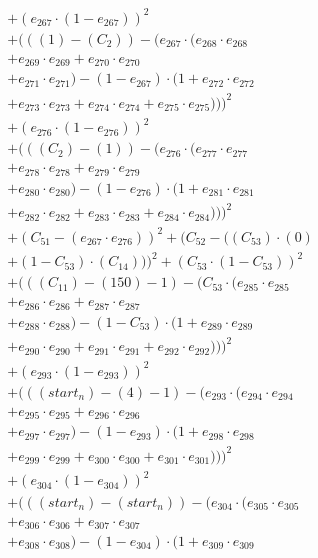 \documentclass[10pt, a4paper]{article}
\begin{document}
\begin{small}
\begin{align*}
& + (e_{267} \cdot (1 - e_{267}))^{2} \\
& + (((1) - (C_{2})) - (e_{267} \cdot (e_{268} \cdot e_{268} \\
& + e_{269} \cdot e_{269} + e_{270} \cdot e_{270} \\
& + e_{271} \cdot e_{271}) - (1 - e_{267}) \cdot (1 + e_{272} \cdot e_{272} \\
& + e_{273} \cdot e_{273} + e_{274} \cdot e_{274} + e_{275} \cdot e_{275})))^{2} \\
& + (e_{276} \cdot (1 - e_{276}))^{2} \\
& + (((C_{2}) - (1)) - (e_{276} \cdot (e_{277} \cdot e_{277} \\
& + e_{278} \cdot e_{278} + e_{279} \cdot e_{279} \\
& + e_{280} \cdot e_{280}) - (1 - e_{276}) \cdot (1 + e_{281} \cdot e_{281} \\
& + e_{282} \cdot e_{282} + e_{283} \cdot e_{283} + e_{284} \cdot e_{284})))^{2} \\
& + (C_{51} - (e_{267} \cdot e_{276}))^{2} + (C_{52} - ((C_{53})  \cdot  (0) \\
& + (1 - C_{53})  \cdot  (C_{14})))^{2} + (C_{53} \cdot (1 - C_{53}))^{2} \\
& + (((C_{11}) - (150) - 1) - (C_{53} \cdot (e_{285} \cdot e_{285} \\
& + e_{286} \cdot e_{286} + e_{287} \cdot e_{287} \\
& + e_{288} \cdot e_{288}) - (1 - C_{53}) \cdot (1 + e_{289} \cdot e_{289} \\
& + e_{290} \cdot e_{290} + e_{291} \cdot e_{291} + e_{292} \cdot e_{292})))^{2} \\
& + (e_{293} \cdot (1 - e_{293}))^{2} \\
& + (((start_n) - (4) - 1) - (e_{293} \cdot (e_{294} \cdot e_{294} \\
& + e_{295} \cdot e_{295} + e_{296} \cdot e_{296} \\
& + e_{297} \cdot e_{297}) - (1 - e_{293}) \cdot (1 + e_{298} \cdot e_{298} \\
& + e_{299} \cdot e_{299} + e_{300} \cdot e_{300} + e_{301} \cdot e_{301})))^{2} \\
& + (e_{304} \cdot (1 - e_{304}))^{2} \\
& + (((start_n) - (start_n)) - (e_{304} \cdot (e_{305} \cdot e_{305} \\
& + e_{306} \cdot e_{306} + e_{307} \cdot e_{307} \\
& + e_{308} \cdot e_{308}) - (1 - e_{304}) \cdot (1 + e_{309} \cdot e_{309} \\

\end{align*}
\end{small}
\end{document}

